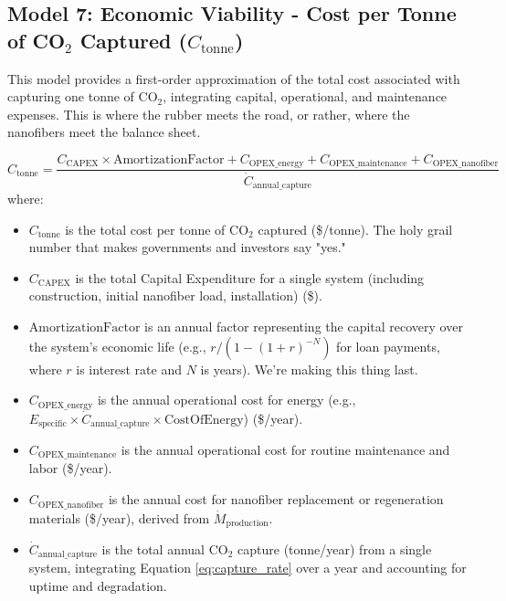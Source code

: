 \documentclass[12pt]{article}
\begin{document}
\subsection*{Model 7: Economic Viability - Cost per Tonne of CO\(_2\) Captured (\(C_{\text{tonne}}\))}
This model provides a first-order approximation of the total cost associated with capturing one tonne of CO\(_2\), integrating capital, operational, and maintenance expenses. This is where the rubber meets the road, or rather, where the nanofibers meet the balance sheet.

\begin{equation}
C_{\text{tonne}} = \frac{C_{\text{CAPEX}} \times \text{AmortizationFactor} + C_{\text{OPEX\_energy}} + C_{\text{OPEX\_maintenance}} + C_{\text{OPEX\_nanofiber}}}{\dot{C}_{\text{annual\_capture}}}
\label{eq:cost_per_tonne}
\end{equation}
where:
\begin{itemize}
    \item \(C_{\text{tonne}}\) is the total cost per tonne of CO\(_2\) captured (\$/tonne). The holy grail number that makes governments and investors say "yes."
    \item \(C_{\text{CAPEX}}\) is the total Capital Expenditure for a single system (including construction, initial nanofiber load, installation) (\$).
    \item \(\text{AmortizationFactor}\) is an annual factor representing the capital recovery over the system's economic life (e.g., \(r / (1 - (1+r)^{-N})\) for loan payments, where \(r\) is interest rate and \(N\) is years). We're making this thing last.
    \item \(C_{\text{OPEX\_energy}}\) is the annual operational cost for energy (e.g., \(E_{\text{specific}} \times \dot{C}_{\text{annual\_capture}} \times \text{CostOfEnergy}\)) (\$/year).
    \item \(C_{\text{OPEX\_maintenance}}\) is the annual operational cost for routine maintenance and labor (\$/year).
    \item \(C_{\text{OPEX\_nanofiber}}\) is the annual cost for nanofiber replacement or regeneration materials (\$/year), derived from \(\dot{M}_{\text{production}}\).
    \item \(\dot{C}_{\text{annual\_capture}}\) is the total annual CO\(_2\) capture (tonne/year) from a single system, integrating Equation \ref{eq:capture_rate} over a year and accounting for uptime and degradation.
\end{itemize}
\end{document}
